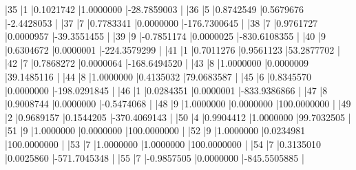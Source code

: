 \documentclass{article}
\begin{document}
\begin{Schunk}
\begin{Soutput}
|35        |1  |0.1021742  |1.0000000 |-28.7859003  |
|36        |5  |0.8742549  |0.5679676 |-2.4428053   |
|37        |7  |0.7783341  |0.0000000 |-176.7300645 |
|38        |7  |0.9761727  |0.0000957 |-39.3551455  |
|39        |9  |-0.7851174 |0.0000025 |-830.6108355 |
|40        |9  |0.6304672  |0.0000001 |-224.3579299 |
|41        |1  |0.7011276  |0.9561123 |53.2877702   |
|42        |7  |0.7868272  |0.0000064 |-168.6494520 |
|43        |8  |1.0000000  |0.0000009 |39.1485116   |
|44        |8  |1.0000000  |0.4135032 |79.0683587   |
|45        |6  |0.8345570  |0.0000000 |-198.0291845 |
|46        |1  |0.0284351  |0.0000001 |-833.9386866 |
|47        |8  |0.9008744  |0.0000000 |-0.5474068   |
|48        |9  |1.0000000  |0.0000000 |100.0000000  |
|49        |2  |0.9689157  |0.1544205 |-370.4069143 |
|50        |4  |0.9904412  |1.0000000 |99.7032505   |
|51        |9  |1.0000000  |0.0000000 |100.0000000  |
|52        |9  |1.0000000  |0.0234981 |100.0000000  |
|53        |7  |1.0000000  |1.0000000 |100.0000000  |
|54        |7  |0.3135010  |0.0025860 |-571.7045348 |
|55        |7  |-0.9857505 |0.0000000 |-845.5505885 |
\end{Soutput}
\end{Schunk}
\end{document}
